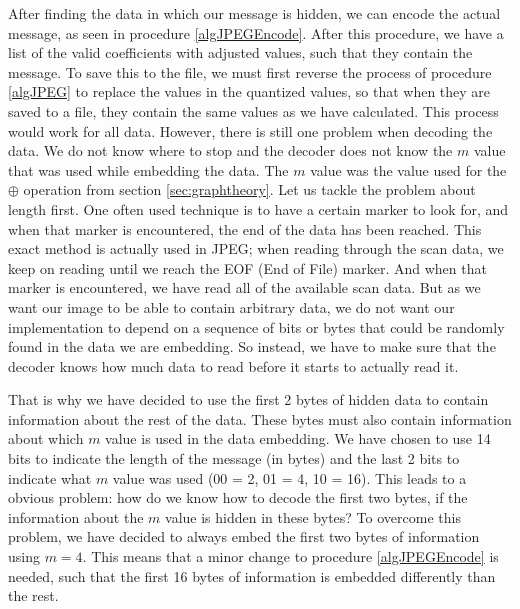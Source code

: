 After finding the data in which our message is hidden, we can encode the actual message, as seen in procedure \ref{algJPEGEncode}. 
After this procedure, we have a list of the valid coefficients with adjusted values, such that they contain the message. 
To save this to the file, we must first reverse the process of procedure \ref{algJPEG} to replace the values in the quantized values, so that when they are saved to a file, they contain the same values as we have calculated. 
This process would work for all data. However, there is still one problem when decoding the data. We do not know where to stop and the decoder does not know the $m$ value that was used while embedding the data. The $m$ value was the value used for the $\oplus$ operation from section \ref{sec:graphtheory}.
Let us tackle the problem about length first. 
One often used technique is to have a certain marker to look for, and when that marker is encountered, the end of the data has been reached. 
This exact method is actually used in JPEG; when reading through the scan data, we keep on reading until we reach the EOF (End of File) marker. 
And when that marker is encountered, we have read all of the available scan data. 
But as we want our image to be able to contain arbitrary data, we do not want our implementation to depend on a sequence of bits or bytes that could be randomly found in the data we are embedding. 
So instead, we have to make sure that the decoder knows how much data to read before it starts to actually read it. 

That is why we have decided to use the first 2 bytes of hidden data to contain information about the rest of the data. 
These bytes must also contain information about which $m$ value is used in the data embedding. 
We have chosen to use 14 bits to indicate the length of the message (in bytes) and the last 2 bits to indicate what $m$ value was used (00 = 2, 01 = 4, 10 = 16). 
This leads to a obvious problem: how do we know how to decode the first two bytes, if the information about the $m$ value is hidden in these bytes? To overcome this problem, we have decided to always embed the first two bytes of information using $m = 4$. 
This means that a minor change to procedure \ref{algJPEGEncode} is needed, such that the first 16 bytes of information is embedded differently than the rest.

